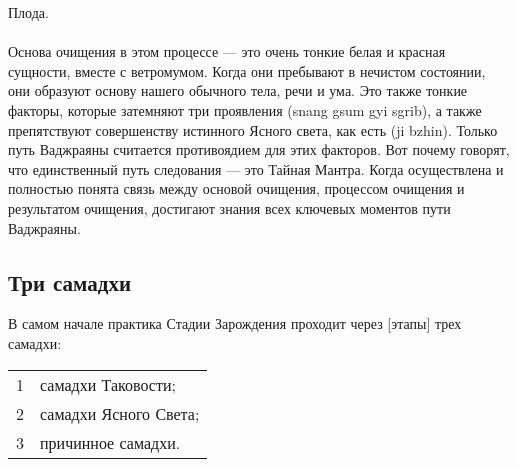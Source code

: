 \begin{siderules}
Плода.\\
\\
Основа очищения в этом процессе — это очень тонкие белая и красная сущности, вместе с
ветромумом. Когда они пребывают в нечистом состоянии, они образуют основу нашего
обычного тела, речи и ума. Это также тонкие факторы, которые затемняют три проявления
(snang gsum gyi sgrib), а также препятствуют совершенству истинного Ясного света, как есть
(ji bzhin). Только путь Ваджраяны считается противоядием для этих факторов. Вот почему
говорят, что единственный путь следования — это Тайная Мантра.
Когда осуществлена и полностью понята связь между основой очищения, процессом
очищения и результатом очищения, достигают знания всех ключевых моментов пути
Ваджраяны.
\end{siderules}

\subsection{Три самадхи}

В самом начале практика Стадии Зарождения проходит через [этапы] трех самадхи:\\

\begin{tabular}{ll}
1 & самадхи Таковости;\\
2 & самадхи Ясного Света;\\
3 & причинное самадхи.
\end{tabular}\\

